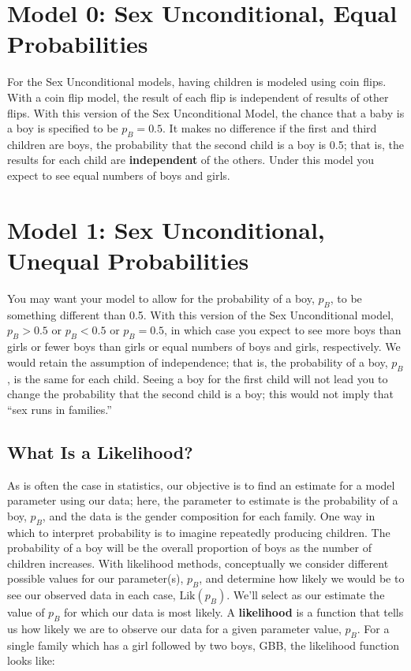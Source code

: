 \documentclass[
]{krantz}
\newcommand{\lik}{\mathrm{Lik}}
\begin{document}
\section{Model 0: Sex Unconditional, Equal Probabilities}\label{model-0-sex-unconditional-equal-probabilities}

For the Sex Unconditional models, having children is modeled using coin flips. With a coin flip model, the result of each flip is independent of results of other flips. With this version of the Sex Unconditional Model, the chance that a baby is a boy is specified to be \(p_B=0.5\). It makes no difference if the first and third children are boys, the probability that the second child is a boy is 0.5; that is, the results for each child are \textbf{independent}  of the others. Under this model you expect to see equal numbers of boys and girls.

\section{Model 1: Sex Unconditional, Unequal Probabilities}\label{sex_unconditional_model}

You may want your model to allow for the probability of a boy, \(p_B\), to be something different than 0.5. With this version of the Sex Unconditional model, \(p_B>0.5\) or \(p_B<0.5\) or \(p_B=0.5\), in which case you expect to see more boys than girls or fewer boys than girls or equal numbers of boys and girls, respectively. We would retain the assumption of independence; that is, the probability of a boy, \(p_B\), is the same for each child. Seeing a boy for the first child will not lead you to change the probability that the second child is a boy; this would not imply that ``sex runs in families.''

\subsection{What Is a Likelihood?}\label{what-is-a-likelihood}

As is often the case in statistics, our objective is to find an estimate for a model parameter using our data; here, the parameter to estimate is the probability of a boy, \(p_B\), and the data is the gender composition for each family. One way in which to interpret probability is to imagine repeatedly producing children. The probability of a boy will be the overall proportion of boys as the number of children increases.
With likelihood methods, conceptually we consider different possible values for our parameter(s), \(p_B\), and determine how likely we would be to see our observed data in each case, \(\lik(p_B)\). We'll select as our estimate the value of \(p_B\) for which our data is most likely. A \textbf{likelihood}  is a function that tells us how likely we are to observe our data for a given parameter value, \(p_B\). For a single family which has a girl followed by two boys, GBB, the likelihood function looks like:
\end{document}

